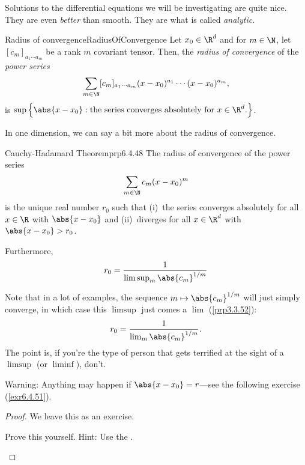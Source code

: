 Solutions to the differential equations we will be investigating are quite nice.  They are even \emph{better} than smooth.  They are what is called \emph{analytic}.
\begin{dfn}{Radius of convergence}{RadiusOfConvergence}
Let $x_0\in \R ^d$ and for $m\in \N$, let $[c_m]_{a_1\cdots a_m}$ be a rank $m$ covariant tensor.  Then, the \emph{radius of convergence} of the \emph{power series}
\begin{equation}
\sum _{m\in \N}[c_m]_{a_1\cdots a_m}(x-x_0)^{a_1}\cdots (x-x_0)^{a_m},
\end{equation}
is $\sup \left\{ \abs{x-x_0}:\text{the series converges absolutely for }x\in \R ^d\text{.}\right\}$.
\end{dfn}
In one dimension, we can say a bit more about the radius of convergence.
\begin{prp}{Cauchy-Hadamard Theorem}{prp6.4.48}
The radius of convergence of the power series
\begin{equation}
\sum _{m\in \N}c_m(x-x_0)^m
\end{equation}
is the unique real number $r_0$ such that (i)~the series converges absolutely for all $x\in \R$ with $\abs{x-x_0}$ and (ii)~diverges for all $x\in \R ^d$ with $\abs{x-x_0}>r_0$.

Furthermore,
\begin{equation}
r_0=\frac{1}{\limsup _m\abs{c_m}^{1/m}}
\end{equation}
\begin{rmk}
Note that in a lot of examples, the sequence $m\mapsto \abs{c_m}^{1/m}$ will just simply converge, in which case this $\limsup$ just comes a $\lim$ (\cref{prp3.3.52}):
\begin{equation}
r_0=\frac{1}{\lim _m\abs{c_m}^{1/m}}.
\end{equation}
The point is, if you're the type of person that gets terrified at the sight of a $\limsup$ (or $\liminf$), don't.
\end{rmk}
\begin{wrn}
Warning:  Anything may happen if $\abs{x-x_0}=r$---see the following exercise (\cref{exr6.4.51}).
\end{wrn}
\begin{proof}
We leave this as an exercise.
\begin{exr}[breakable=false]{}{}
Prove this yourself.  Hint:  Use the .
\end{exr}
\end{proof}
\end{prp}
